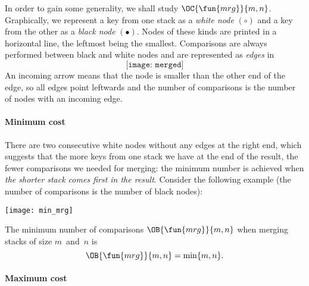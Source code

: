 In order to gain some generality, we shall study
\(\OC{\fun{mrg}}{m,n}\). Graphically, we represent a key from one
stack as a \emph{white node} \((\circ)\) and a key from the other as a
\emph{black node} \((\bullet)\). Nodes of these kinds are printed in a
horizontal line, the leftmost being the smallest. Comparisons are
always performed between black and white nodes and are represented as
\emph{edges} in%
\begin{equation}
\texttt{[image: merged]}%
\label{fig:merged}
\end{equation}
An incoming arrow means that the node is smaller than the other end of
the edge, so all edges point leftwards and the number of comparisons
is the number of nodes with an incoming edge.

\paragraph{Minimum cost}
\label{merge:best_case}

There are two consecutive white nodes without any edges at the right
end, which suggests that the more keys from one stack we have at the
end of the result, the fewer comparisons we needed for merging: the
minimum number is achieved when \emph{the shorter stack comes first in
  the result}. Consider the following example (the number of
comparisons is the number of black nodes):
\begin{center}
\texttt{[image: min\_mrg]}
\end{center}
The minimum number of comparisons
\(\OB{\fun{mrg}}{m,n}\) when merging
stacks of size \(m\)~and~\(n\) is
\begin{equation}
\OB{\fun{mrg}}{m,n} = \min\{m,n\}.\label{eq:best_merge}
\end{equation}

\paragraph{Maximum cost}

